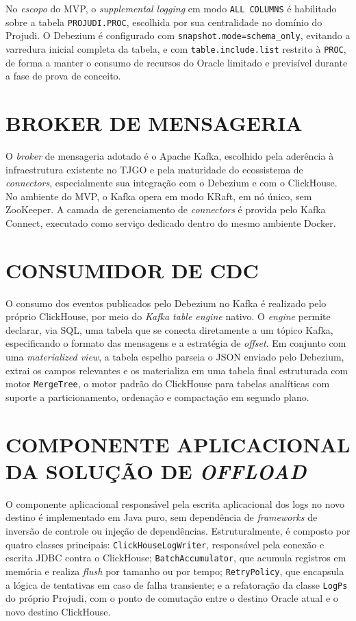 \documentclass[12pt,letterpaper,oneside]{report}
\begin{document}
No \textit{escopo} do MVP, o \textit{supplemental logging} em modo \texttt{ALL COLUMNS} é habilitado sobre a tabela \texttt{PROJUDI.PROC}, escolhida por sua centralidade no domínio do Projudi. O Debezium é configurado com \texttt{snapshot.mode=schema\_only}, evitando a varredura inicial completa da tabela, e com \texttt{table.include.list} restrito à \texttt{PROC}, de forma a manter o consumo de recursos do Oracle limitado e previsível durante a fase de prova de conceito.

\section{BROKER DE MENSAGERIA}

O \textit{broker} de mensageria adotado é o Apache Kafka, escolhido pela aderência à infraestrutura existente no TJGO e pela maturidade do ecossistema de \textit{connectors}, especialmente sua integração com o Debezium e com o ClickHouse. No ambiente do MVP, o Kafka opera em modo KRaft, em nó único, sem ZooKeeper. A camada de gerenciamento de \textit{connectors} é provida pelo Kafka Connect, executado como serviço dedicado dentro do mesmo ambiente Docker.

\section{CONSUMIDOR DE CDC}

O consumo dos eventos publicados pelo Debezium no Kafka é realizado pelo próprio ClickHouse, por meio do \textit{Kafka table engine} nativo. O \textit{engine} permite declarar, via SQL, uma tabela que se conecta diretamente a um tópico Kafka, especificando o formato das mensagens e a estratégia de \textit{offset}. Em conjunto com uma \textit{materialized view}, a tabela espelho parseia o JSON enviado pelo Debezium, extrai os campos relevantes e os materializa em uma tabela final estruturada com motor \texttt{MergeTree}, o motor padrão do ClickHouse para tabelas analíticas com suporte a particionamento, ordenação e compactação em segundo plano.

\section{COMPONENTE APLICACIONAL DA SOLUÇÃO DE \textit{OFFLOAD}}

O componente aplicacional responsável pela escrita aplicacional dos logs no novo destino é implementado em Java puro, sem dependência de \textit{frameworks} de inversão de controle ou injeção de dependências. Estruturalmente, é composto por quatro classes principais: \texttt{ClickHouseLogWriter}, responsável pela conexão e escrita JDBC contra o ClickHouse; \texttt{BatchAccumulator}, que acumula registros em memória e realiza \textit{flush} por tamanho ou por tempo; \texttt{RetryPolicy}, que encapsula a lógica de tentativas em caso de falha transiente; e a refatoração da classe \texttt{LogPs} do próprio Projudi, com o ponto de comutação entre o destino Oracle atual e o novo destino ClickHouse.
\end{document}
